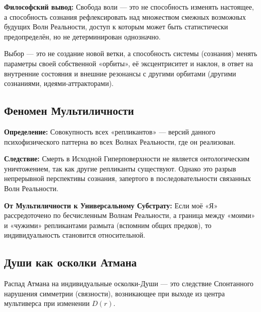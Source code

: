 \documentclass[a4paper,12pt]{article}
\begin{document}
\textbf{Философский вывод:} Свобода воли — это не способность изменять настоящее, а способность сознания рефлексировать над множеством смежных возможных будущих Волн Реальности, доступ к которым может быть статистически предопределён, но не детерминирован однозначно.

Выбор — это не создание новой ветки, а способность системы (сознания) менять параметры своей собственной «орбиты», её эксцентриситет и наклон, в ответ на внутренние состояния и внешние резонансы с другими орбитами (другими сознаниями, идеями-аттракторами).

\subsection{Феномен Мультиличности}

\textbf{Определение:} Совокупность всех «репликантов» — версий данного психофизического паттерна во всех Волнах Реальности, где он реализован.

\textbf{Следствие:} Смерть в Исходной Гиперповерхности не является онтологическим уничтожением, так как другие репликанты существуют. Однако это разрыв непрерывной перспективы сознания, запертого в последовательности связанных Волн Реальности.

\textbf{От Мультиличности к Универсальному Субстрату:} Если моё «Я» рассредоточено по бесчисленным Волнам Реальности, а граница между «моими» и «чужими» репликантами размыта (вспомним общих предков), то индивидуальность становится относительной.

\subsection{Души как осколки Атмана}

Распад Атмана на индивидуальные осколки-Души — это следствие Спонтанного нарушения симметрии (связности), возникающее при выходе из центра мультиверса при изменении $D(r)$.
\end{document}
